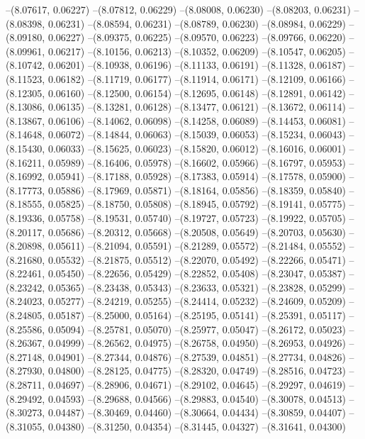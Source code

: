 --(8.07617, 0.06227)
--(8.07812, 0.06229)
--(8.08008, 0.06230)
--(8.08203, 0.06231)
--(8.08398, 0.06231)
--(8.08594, 0.06231)
--(8.08789, 0.06230)
--(8.08984, 0.06229)
--(8.09180, 0.06227)
--(8.09375, 0.06225)
--(8.09570, 0.06223)
--(8.09766, 0.06220)
--(8.09961, 0.06217)
--(8.10156, 0.06213)
--(8.10352, 0.06209)
--(8.10547, 0.06205)
--(8.10742, 0.06201)
--(8.10938, 0.06196)
--(8.11133, 0.06191)
--(8.11328, 0.06187)
--(8.11523, 0.06182)
--(8.11719, 0.06177)
--(8.11914, 0.06171)
--(8.12109, 0.06166)
--(8.12305, 0.06160)
--(8.12500, 0.06154)
--(8.12695, 0.06148)
--(8.12891, 0.06142)
--(8.13086, 0.06135)
--(8.13281, 0.06128)
--(8.13477, 0.06121)
--(8.13672, 0.06114)
--(8.13867, 0.06106)
--(8.14062, 0.06098)
--(8.14258, 0.06089)
--(8.14453, 0.06081)
--(8.14648, 0.06072)
--(8.14844, 0.06063)
--(8.15039, 0.06053)
--(8.15234, 0.06043)
--(8.15430, 0.06033)
--(8.15625, 0.06023)
--(8.15820, 0.06012)
--(8.16016, 0.06001)
--(8.16211, 0.05989)
--(8.16406, 0.05978)
--(8.16602, 0.05966)
--(8.16797, 0.05953)
--(8.16992, 0.05941)
--(8.17188, 0.05928)
--(8.17383, 0.05914)
--(8.17578, 0.05900)
--(8.17773, 0.05886)
--(8.17969, 0.05871)
--(8.18164, 0.05856)
--(8.18359, 0.05840)
--(8.18555, 0.05825)
--(8.18750, 0.05808)
--(8.18945, 0.05792)
--(8.19141, 0.05775)
--(8.19336, 0.05758)
--(8.19531, 0.05740)
--(8.19727, 0.05723)
--(8.19922, 0.05705)
--(8.20117, 0.05686)
--(8.20312, 0.05668)
--(8.20508, 0.05649)
--(8.20703, 0.05630)
--(8.20898, 0.05611)
--(8.21094, 0.05591)
--(8.21289, 0.05572)
--(8.21484, 0.05552)
--(8.21680, 0.05532)
--(8.21875, 0.05512)
--(8.22070, 0.05492)
--(8.22266, 0.05471)
--(8.22461, 0.05450)
--(8.22656, 0.05429)
--(8.22852, 0.05408)
--(8.23047, 0.05387)
--(8.23242, 0.05365)
--(8.23438, 0.05343)
--(8.23633, 0.05321)
--(8.23828, 0.05299)
--(8.24023, 0.05277)
--(8.24219, 0.05255)
--(8.24414, 0.05232)
--(8.24609, 0.05209)
--(8.24805, 0.05187)
--(8.25000, 0.05164)
--(8.25195, 0.05141)
--(8.25391, 0.05117)
--(8.25586, 0.05094)
--(8.25781, 0.05070)
--(8.25977, 0.05047)
--(8.26172, 0.05023)
--(8.26367, 0.04999)
--(8.26562, 0.04975)
--(8.26758, 0.04950)
--(8.26953, 0.04926)
--(8.27148, 0.04901)
--(8.27344, 0.04876)
--(8.27539, 0.04851)
--(8.27734, 0.04826)
--(8.27930, 0.04800)
--(8.28125, 0.04775)
--(8.28320, 0.04749)
--(8.28516, 0.04723)
--(8.28711, 0.04697)
--(8.28906, 0.04671)
--(8.29102, 0.04645)
--(8.29297, 0.04619)
--(8.29492, 0.04593)
--(8.29688, 0.04566)
--(8.29883, 0.04540)
--(8.30078, 0.04513)
--(8.30273, 0.04487)
--(8.30469, 0.04460)
--(8.30664, 0.04434)
--(8.30859, 0.04407)
--(8.31055, 0.04380)
--(8.31250, 0.04354)
--(8.31445, 0.04327)
--(8.31641, 0.04300)
